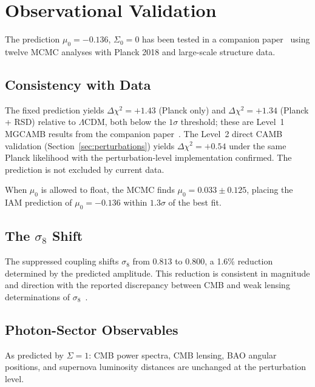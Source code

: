 \documentclass[11pt]{article}
\begin{document}
\section{Observational Validation}
\label{sec:validation}

The prediction $\mu_0 = -0.136$, $\Sigma_0 = 0$ has been tested in a
companion paper~\citep{Mahaffey2026obs} using twelve MCMC analyses with
Planck 2018 and large-scale structure data.

\subsection{Consistency with Data}

The fixed prediction yields $\Delta\chi^2 = +1.43$ (Planck only) and
$\Delta\chi^2 = +1.34$ (Planck + RSD) relative to $\Lambda$CDM, both below
the $1\sigma$ threshold; these are Level~1 MGCAMB results from the companion
paper~\citep{Mahaffey2026obs}.  The Level~2 direct CAMB validation
(Section~\ref{sec:perturbations}) yields $\Delta\chi^2 = +0.54$ under the
same Planck likelihood with the perturbation-level implementation confirmed.
The prediction is not excluded by current data.

When $\mu_0$ is allowed to float, the MCMC finds
$\mu_0 = 0.033 \pm 0.125$, placing the IAM prediction of $\mu_0 = -0.136$
within $1.3\sigma$ of the best fit.

\subsection{The $\sigma_8$ Shift}

The suppressed coupling shifts $\sigma_8$ from $0.813$ to $0.800$, a 1.6\%
reduction determined by the predicted amplitude.  This reduction is
consistent in magnitude and direction with the reported discrepancy between
CMB and weak lensing determinations of
$\sigma_8$~\citep{Heymans2021,Abbott2022}.

\subsection{Photon-Sector Observables}

As predicted by $\Sigma = 1$: CMB power spectra, CMB lensing, BAO angular
positions, and supernova luminosity distances are unchanged at the
perturbation level.
\end{document}
